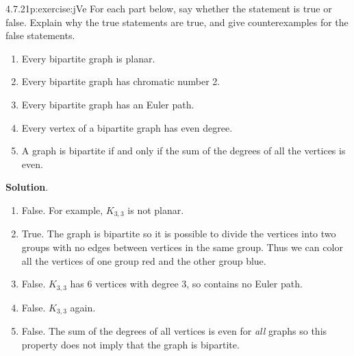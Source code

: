 \documentclass[twoside,11pt,]{book}
\newcommand{\blocktitlefont}{\relax}
\numberwithin{equation}{chapter}
\begin{document}
\begin{divisionsolution}{4.7.21}{}{p:exercise:jVe}%
For each part below, say whether the statement is true or false. Explain why the true statements are true, and give counterexamples for the false statements.%
\begin{enumerate}[label=(\alph*)]
\item{}Every bipartite graph is planar.%
\item{}Every bipartite graph has chromatic number 2.%
\item{}Every bipartite graph has an Euler path.%
\item{}Every vertex of a bipartite graph has even degree.%
\item{}A graph is bipartite if and only if the sum of the degrees of all the vertices is even.%
\end{enumerate}
%
\par\smallskip%
\noindent\textbf{\blocktitlefont Solution}.\quad{}%
\begin{enumerate}[label=(\alph*)]
\item{}False. For example, \(K_{3,3}\) is not planar.%
\item{}True. The graph is bipartite so it is possible to divide the vertices into two groups with no edges between vertices in the same group. Thus we can color all the vertices of one group red and the other group blue.%
\item{}False. \(K_{3,3}\) has 6 vertices with degree 3, so contains no Euler path.%
\item{}False. \(K_{3,3}\) again.%
\item{}False. The sum of the degrees of all vertices is even for \emph{all} graphs so this property does not imply that the graph is bipartite.%
\end{enumerate}
%
\end{divisionsolution}%
\end{document}
